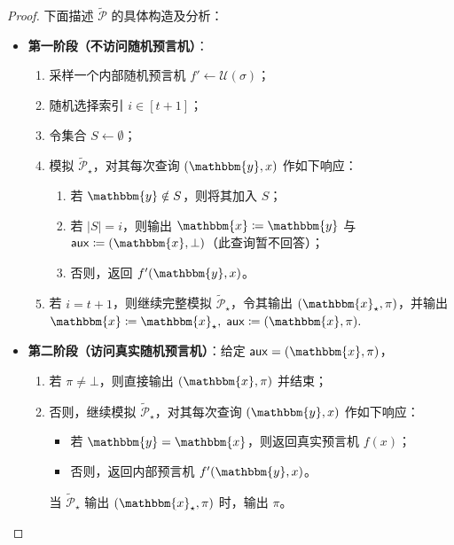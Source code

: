 \documentclass[american,singlepageview]{snargs-book-zh}
\newcommand{\Malicious}[1]{\tilde{#1}}
\newcommand{\DefineEqual}{\coloneqq}
\newcommand{\AuxiliaryState}{\mathsf{aux}}
\newcommand{\Instance}{\mathbbm{x}}
\newcommand{\AltInstance}{\mathbbm{y}}
\newcommand{\ProtoProver}{P}
\newcommand{\ARGFormat}[1]{\mathcal{#1}}
\newcommand{\ARGProver}{\ARGFormat{\ProtoProver}}
\newcommand{\ARGString}{\pi}
\newcommand{\ROFunction}{f}
\newcommand{\ROQueryBound}{t}
\newcommand{\RODistribution}[1]{\mathcal{U}(#1)}
\newcommand{\ROQuery}{x}
\newcommand{\ROAdvState}{\AuxiliaryState}
\newcommand{\ROOutputSize}{\sigma}
\begin{document}
\begin{proof}
下面描述 $\Malicious{\ARGProver}$ 的具体构造及分析：
\begin{itemize}
  \item \textbf{第一阶段（不访问随机预言机）}：
    \begin{enumerate}[noitemsep]
      \item 采样一个内部随机预言机 $\ROFunction'\!\gets\RODistribution{\ROOutputSize}$；
      \item 随机选择索引 $i\in[\ROQueryBound+1]$；
      \item 令集合 $S\gets\emptyset$；
      \item 模拟 $\Malicious{\ARGProver}_{\star}$，对其每次查询 $(\AltInstance,\ROQuery)$ 作如下响应：
        \begin{enumerate}
          \item 若 $\AltInstance\notin S$，则将其加入 $S$；
          \item 若 $\lvert S\rvert=i$，则输出 $\Instance\DefineEqual\AltInstance$ 与 $\ROAdvState\DefineEqual(\Instance,\bot)$（此查询暂不回答）；
          \item 否则，返回 $\ROFunction'(\AltInstance,\ROQuery)$。
        \end{enumerate}
      \item 若 $i=\ROQueryBound+1$，则继续完整模拟 $\Malicious{\ARGProver}_{\star}$，令其输出 $(\Instance_{\star},\ARGString)$，并输出
      \(\Instance\DefineEqual\Instance_{\star},\;
       \ROAdvState\DefineEqual(\Instance,\ARGString).\)
    \end{enumerate}

  \item \textbf{第二阶段（访问真实随机预言机）}：给定 $\ROAdvState=(\Instance,\ARGString)$，
    \begin{enumerate}[noitemsep]
      \item 若 $\ARGString\neq\bot$，则直接输出 $(\Instance,\ARGString)$ 并结束；
      \item 否则，继续模拟 $\Malicious{\ARGProver}_{\star}$，对其每次查询 $(\AltInstance,\ROQuery)$ 作如下响应：
        \begin{itemize}[noitemsep]
          \item 若 $\AltInstance=\Instance$，则返回真实预言机 $\ROFunction(\ROQuery)$；
          \item 否则，返回内部预言机 $\ROFunction'(\AltInstance,\ROQuery)$。
        \end{itemize}
      当 $\Malicious{\ARGProver}_{\star}$ 输出 $(\Instance_{\star},\ARGString)$ 时，输出 $\ARGString$。
    \end{enumerate}
\end{itemize}


\end{proof}
\end{document}
